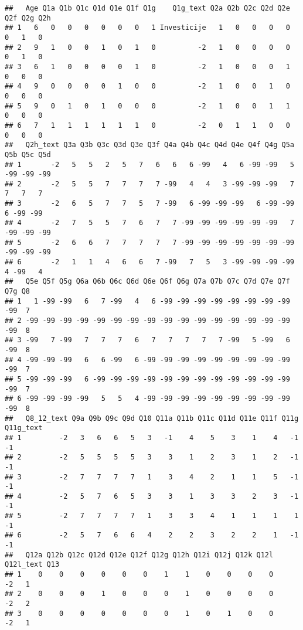 \documentclass[
]{article}
\begin{document}
\begin{verbatim}
##   Age Q1a Q1b Q1c Q1d Q1e Q1f Q1g    Q1g_text Q2a Q2b Q2c Q2d Q2e Q2f Q2g Q2h
## 1   6   0   0   0   0   0   0   1 Investicije   1   0   0   0   0   0   1   0
## 2   9   1   0   0   1   0   1   0          -2   1   0   0   0   0   0   1   0
## 3   6   1   0   0   0   0   1   0          -2   1   0   0   0   1   0   0   0
## 4   9   0   0   0   0   1   0   0          -2   1   0   0   1   0   0   0   0
## 5   9   0   1   0   1   0   0   0          -2   1   0   0   1   1   0   0   0
## 6   7   1   1   1   1   1   1   0          -2   0   1   1   0   0   0   0   0
##   Q2h_text Q3a Q3b Q3c Q3d Q3e Q3f Q4a Q4b Q4c Q4d Q4e Q4f Q4g Q5a Q5b Q5c Q5d
## 1       -2   5   5   2   5   7   6   6   6 -99   4   6 -99 -99   5 -99 -99 -99
## 2       -2   5   5   7   7   7   7 -99   4   4   3 -99 -99 -99   7   7   7   7
## 3       -2   6   5   7   7   5   7 -99   6 -99 -99 -99   6 -99 -99   6 -99 -99
## 4       -2   7   5   5   7   6   7   7 -99 -99 -99 -99 -99 -99   7 -99 -99 -99
## 5       -2   6   6   7   7   7   7   7 -99 -99 -99 -99 -99 -99 -99 -99 -99 -99
## 6       -2   1   1   4   6   6   7 -99   7   5   3 -99 -99 -99 -99   4 -99   4
##   Q5e Q5f Q5g Q6a Q6b Q6c Q6d Q6e Q6f Q6g Q7a Q7b Q7c Q7d Q7e Q7f Q7g Q8
## 1   1 -99 -99   6   7 -99   4   6 -99 -99 -99 -99 -99 -99 -99 -99 -99  7
## 2 -99 -99 -99 -99 -99 -99 -99 -99 -99 -99 -99 -99 -99 -99 -99 -99 -99  8
## 3 -99   7 -99   7   7   7   6   7   7   7   7   7 -99   5 -99   6 -99  8
## 4 -99 -99 -99   6   6 -99   6 -99 -99 -99 -99 -99 -99 -99 -99 -99 -99  7
## 5 -99 -99 -99   6 -99 -99 -99 -99 -99 -99 -99 -99 -99 -99 -99 -99 -99  7
## 6 -99 -99 -99 -99   5   5   4 -99 -99 -99 -99 -99 -99 -99 -99 -99 -99  8
##   Q8_12_text Q9a Q9b Q9c Q9d Q10 Q11a Q11b Q11c Q11d Q11e Q11f Q11g Q11g_text
## 1         -2   3   6   6   5   3   -1    4    5    3    1    4   -1        -1
## 2         -2   5   5   5   5   3    3    1    2    3    1    2   -1        -1
## 3         -2   7   7   7   7   1    3    4    2    1    1    5   -1        -1
## 4         -2   5   7   6   5   3    3    1    3    3    2    3   -1        -1
## 5         -2   7   7   7   7   1    3    3    4    1    1    1    1        -1
## 6         -2   5   7   6   6   4    2    2    3    2    2    1   -1        -1
##   Q12a Q12b Q12c Q12d Q12e Q12f Q12g Q12h Q12i Q12j Q12k Q12l Q12l_text Q13
## 1    0    0    0    0    0    0    1    1    0    0    0    0        -2   1
## 2    0    0    0    1    0    0    0    1    0    0    0    0        -2   2
## 3    0    0    0    0    0    0    0    1    0    1    0    0        -2   1

\end{verbatim}
\end{document}
